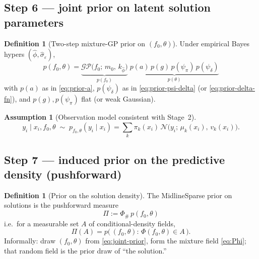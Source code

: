 \documentclass[11pt,a4paper]{article}
\theoremstyle{plain}
\theoremstyle{definition}
\newtheorem{definition}[theorem]{Definition}
\newtheorem{assumption}[theorem]{Assumption}
\theoremstyle{remark}
\newcommand{\Ncal}{\mathcal{N}}
\newcommand{\GP}{\mathcal{GP}}
\newcommand{\tht}{\theta}
\begin{document}
\subsection{Step 6 --- joint prior on latent solution parameters}
\begin{definition}[Two-step mixture-GP prior on \((f_0,\tht)\)]
\label{def:joint-prior}
Under empirical Bayes hypers \((\hat\phi,\hat\sigma_\varepsilon)\),
\begin{equation}
  \boxed{
  p(f_0,\tht)
  =
  \underbrace{
    \GP\bigl(f_0;\,m_0,\,k_{\hat\phi}\bigr)
  }_{p(f_0)}
  \;
  \underbrace{
    p(a)\,p(g)\,p(\psi_\pi)\,p(\psi_\delta)
  }_{p(\tht)}
  }
  \label{eq:joint-prior}
\end{equation}
with \(p(a)\) as in \eqref{eq:prior-a}, \(p(\psi_\delta)\) as in
\eqref{eq:prior-psi-delta} (or \eqref{eq:prior-delta-fn}), and \(p(g),p(\psi_\pi)\)
flat (or weak Gaussian).
\end{definition}

\begin{assumption}[Observation model consistent with Stage~2]
\label{ass:hier}
\[
  y_i\mid x_i,f_0,\tht
  \;\sim\;
  p_{f_0,\tht}(y_i\mid x_i)
  =
  \sum_k\pi_k(x_i)\,
  \Ncal\!\bigl(y_i;\,\mu_k(x_i),\,v_k(x_i)\bigr).
\]
\end{assumption}

\subsection{Step 7 --- induced prior on the predictive density (pushforward)}
\begin{definition}[Prior on the solution density]
The MidlineSparse prior on solutions is the pushforward measure
\begin{equation}
  \boxed{
  \Pi
  :=
  \Phi_\#\, p(f_0,\tht)
  }
  \label{eq:Pi}
\end{equation}
i.e.\ for a measurable set \(A\) of conditional-density fields,
\[
  \Pi(A)
  =
  p\bigl(\,(f_0,\tht):\,\Phi(f_0,\tht)\in A\,\bigr).
\]
Informally: draw \((f_0,\tht)\) from \eqref{eq:joint-prior}, form the mixture field
\eqref{eq:Phi}; that random field is the prior draw of ``the solution.''
\end{definition}
\end{document}
